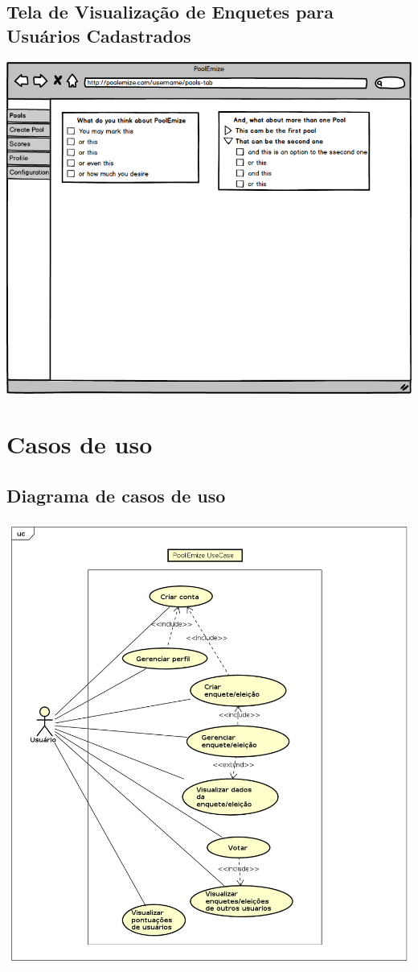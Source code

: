 \documentclass[a4paper,12pt]{article}
\begin{document}
\subsection*{Tela de Visualização de Enquetes para Usuários Cadastrados}
\markright{}
\includegraphics[width=15cm]{mockups/PoollsTab.png}

\newpage
\section*{Casos de uso}
\markright{}
\subsection*{Diagrama de casos de uso}
\markright{}
\includegraphics[width=15cm]{use_cases/UseCaseDiagram0.png}
\newpage
\end{document}
